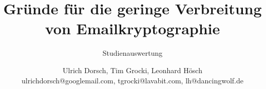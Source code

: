 \usepackage[utf8]{inputenc}

\title[Studie Emailkryptographie]{Gründe für die geringe Verbreitung von Emailkryptographie}
\subtitle{Studienauswertung}
\author{Ulrich Dorsch, Tim Grocki, Leonhard Hösch  \\ {\tiny ulrichdorsch@googlemail.com, tgrocki@lavabit.com, lh@dancingwolf.de \\}}
